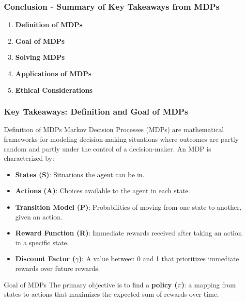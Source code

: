 \documentclass[aspectratio=169]{beamer}
\begin{document}
\begin{frame}[fragile]
    \frametitle{Conclusion - Summary of Key Takeaways from MDPs}
    \begin{enumerate}
        \item \textbf{Definition of MDPs}
        \item \textbf{Goal of MDPs}
        \item \textbf{Solving MDPs}
        \item \textbf{Applications of MDPs}
        \item \textbf{Ethical Considerations}
    \end{enumerate}
\end{frame}

\begin{frame}[fragile]
    \frametitle{Key Takeaways: Definition and Goal of MDPs}
    \begin{block}{Definition of MDPs}
        Markov Decision Processes (MDPs) are mathematical frameworks for modeling decision-making situations where outcomes are partly random and partly under the control of a decision-maker. An MDP is characterized by:
        \begin{itemize}
            \item \textbf{States (S)}: Situations the agent can be in.
            \item \textbf{Actions (A)}: Choices available to the agent in each state.
            \item \textbf{Transition Model (P)}: Probabilities of moving from one state to another, given an action.
            \item \textbf{Reward Function (R)}: Immediate rewards received after taking an action in a specific state.
            \item \textbf{Discount Factor ($\gamma$)}: A value between 0 and 1 that prioritizes immediate rewards over future rewards.
        \end{itemize}
    \end{block}

    \begin{block}{Goal of MDPs}
        The primary objective is to find a \textbf{policy ($\pi$)}: a mapping from states to actions that maximizes the expected sum of rewards over time.
    \end{block}
\end{frame}
\end{document}
